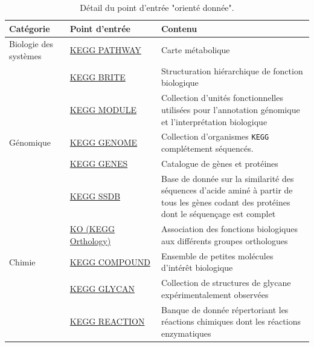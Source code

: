 \begin{refsegment}
    
    \begin{table}[H]
        \small
        \caption{Détail du point d'entrée "orienté donnée". }\label{tab:kegg_data_oriented}
        \label{tab:kegg_oriented_data} 
        \begin{tabular}{p{0.2\linewidth}|p{0.3\linewidth}|p{0.5\linewidth}}
            \toprule
            Catégorie               & Point d'entrée                                                        & Contenu \\
            \midrule
            Biologie des systèmes  & \href{http://www.genome.jp/kegg/pathway.html}{KEGG PATHWAY}           & Carte métabolique \\   
            \cline{2-3}
                                    & \href{http://www.genome.jp/kegg/brite.html}{KEGG BRITE}               & Structuration hiérarchique de fonction biologique \\
            \cline{2-3}             & \href{http://www.genome.jp/kegg/module.html}{KEGG MODULE}             & Collection d'unités fonctionnelles utilisées pour l'annotation génomique et l'interprétation biologique \\
            \hline
            Génomique               & \href{http://www.genome.jp/kegg/genome.html}{KEGG GENOME}             & Collection d'organismes \texttt{\gls{KEGG}} complétement séquencés. \\
            \cline{2-3}             & \href{http://www.genome.jp/kegg/genes.html}{KEGG GENES}               & Catalogue de gènes et protéines \\
            \cline{2-3}             & \href{http://www.kegg.jp/kegg/ssdb/}{KEGG SSDB}                       & Base de donnée sur la similarité des séquences d'acide aminé à partir de tous les gènes codant des protéines dont le séquençage est complet \\
            \cline{2-3}             & \href{http://www.genome.jp/kegg/ko.html}{KO (KEGG Orthology)}         & Association des fonctions biologiques aux différents groupes orthologues  \\
            \hline
            Chimie                  & \href{http://www.genome.jp/kegg/compound/}{KEGG COMPOUND}             & Ensemble de petites molécules d'intérêt biologique\\
            \cline{2-3}             & \href{http://www.genome.jp/kegg/glycan/}{KEGG GLYCAN}                 & Collection de structures de glycane expérimentalement observées \\
            \cline{2-3}             & \href{http://www.genome.jp/kegg/reaction/}{KEGG REACTION}             & Banque de donnée répertoriant les réactions chimiques dont les réactions enzymatiques\\

\end{tabular}
\end{table}
\end{refsegment}
